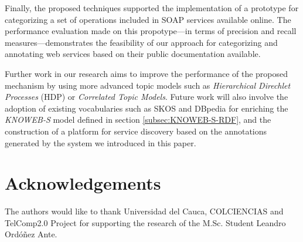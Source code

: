 Finally, the proposed techniques supported the implementation of a prototype for categorizing a set of operations included in SOAP services available online. The performance evaluation made on this propotype---in terms of precision and recall measures---demonstrates the feasibility of our approach for categorizing and annotating web services based on their public documentation available.

Further work in our research aims to improve the performance of the proposed mechanism by using more advanced topic models such as \textit{Hierarchical Direchlet Processes} (HDP) or \textit{Correlated Topic Models}. Future work will also involve the adoption of existing vocabularies such as SKOS and DBpedia for enriching the \textit{KNOWEB-S} model defined in section \ref{subsec:KNOWEB-S-RDF}, and the construction of a platform for service discovery based on the annotations generated by the system we introduced in this paper.  



\section*{Acknowledgements}

The authors would like to thank Universidad del Cauca, COLCIENCIAS and TelComp2.0 Project for supporting the research of the M.Sc. Student Leandro Ordóñez Ante.
